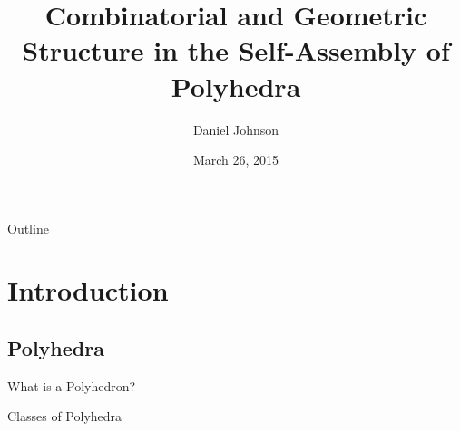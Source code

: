 \documentclass{beamer}
\title{Combinatorial and Geometric Structure in the Self-Assembly of Polyhedra}
\author{Daniel Johnson}
\date{March 26, 2015}
\begin{document}

\frame{\titlepage}

\section[Outline]{}
\begin{frame}{Outline}
  \tableofcontents
\end{frame}
\section{Introduction}
\subsection{Polyhedra}
\begin{frame}{What is a Polyhedron?}
\end{frame}
\begin{frame}{Classes of Polyhedra}
\end{frame}
\end{document}
